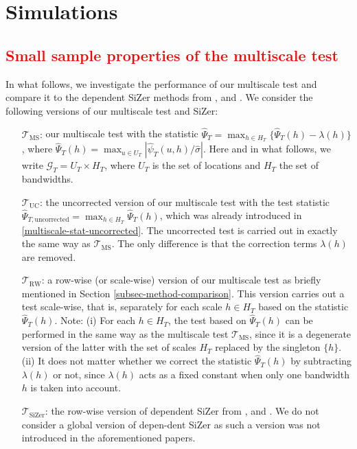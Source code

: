 
\section{Simulations}\label{sec-sim}


\subsection{\textcolor{red}{Small sample properties of the multiscale test}}\label{subsec-sim-multiscale}


In what follows, we investigate the performance of our multiscale test and compare it to the dependent SiZer methods from \cite{Rondonotti2004}, \cite{Rondonotti2007} and \cite{ParkHannigKang2009}. We consider the following versions of our multiscale test and SiZer:
\begin{itemize}[leftmargin=1.25cm]

\item[$\mathcal{T}_{\text{MS}}$:] our multiscale test with the statistic $\widehat{\Psi}_T = \max_{h \in H_T} \{ \widehat{\Psi}_T(h) - \lambda(h) \}$, where $\widehat{\Psi}_T(h) = \max_{u \in U_T} |\widehat{\psi}_T(u,h) / \widehat{\sigma}|$. Here and in what follows, we write $\mathcal{G}_T = U_T \times H_T$, where $U_T$ is the set of locations and $H_T$ the set of bandwidths.  

\item[$\mathcal{T}_{\text{UC}}$:] the uncorrected version of our multiscale test with the test statistic $\widehat{\Psi}_{T,\text{uncorrected}} = \max_{h \in H_T} \widehat{\Psi}_T(h)$, which was already introduced in \eqref{multiscale-stat-uncorrected}. The uncorrected test is carried out in exactly the same way as $\mathcal{T}_{\text{MS}}$. The only difference is that the correction terms $\lambda(h)$ are removed. 

\item[$\mathcal{T}_{\text{RW}}$:] a row-wise (or scale-wise) version of our multiscale test as briefly mentioned in Section \ref{subsec-method-comparison}. This version carries out a test scale-wise, that is, separately for each scale $h \in H_T$ based on the statistic $\widehat{\Psi}_T(h)$. Note: (i) For each $h \in H_T$, the test based on $\widehat{\Psi}_T(h)$ can be performed in the same way as the multiscale test $\mathcal{T}_{\text{MS}}$, since it is a degenerate version of the latter with the set of scales $H_T$ replaced by the singleton $\{h\}$. (ii) It does not matter whether we correct the statistic $\widehat{\Psi}_T(h)$ by subtracting $\lambda(h)$ or not, since $\lambda(h)$ acts as a fixed constant when only one bandwidth $h$ is taken into account. 

\item[$\mathcal{T}_{\text{SiZer}}$:] the row-wise version of dependent SiZer from \cite{Rondonotti2004}, \cite{Rondonotti2007} and \cite{ParkHannigKang2009}. We do not consider a global version of depen-\linebreak dent SiZer as such a version was not introduced in the aforementioned papers. 

\end{itemize}


